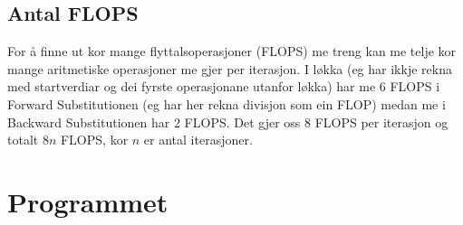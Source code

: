 \documentclass[11pt, a4paper]{article}
\begin{document}
  \subsection{Antal FLOPS}
    For å finne ut kor mange flyttalsoperasjoner (FLOPS) me treng kan me telje kor mange 
    aritmetiske operasjoner me gjer per iterasjon. I løkka (eg har ikkje rekna med startverdiar og 
    dei fyrste operasjonane utanfor løkka) har me 6 FLOPS i Forward Substitutionen (eg har her 
    rekna divisjon som ein FLOP) medan me i Backward Substitutionen har 2 FLOPS. Det gjer oss 8 FLOPS 
    per iterasjon og totalt $8n$ FLOPS, kor $n$ er antal iterasjoner.




\section{Programmet}
\end{document}
